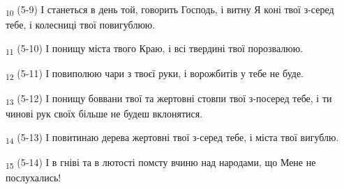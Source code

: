 \begin{tcolorbox}
\textsubscript{10} (5-9) І станеться в день той, говорить Господь, і витну Я коні твої з-серед тебе, і колесниці твої повигублюю.
\end{tcolorbox}
\begin{tcolorbox}
\textsubscript{11} (5-10) І понищу міста твого Краю, і всі твердині твої порозвалюю.
\end{tcolorbox}
\begin{tcolorbox}
\textsubscript{12} (5-11) І повиполюю чари з твоєї руки, і ворожбитів у тебе не буде.
\end{tcolorbox}
\begin{tcolorbox}
\textsubscript{13} (5-12) І понищу боввани твої та жертовні стовпи твої з-посеред тебе, і ти чинові рук своїх більше не будеш вклонятися.
\end{tcolorbox}
\begin{tcolorbox}
\textsubscript{14} (5-13) І повитинаю дерева жертовні твої з-серед тебе, і міста твої вигублю.
\end{tcolorbox}
\begin{tcolorbox}
\textsubscript{15} (5-14) І в гніві та в лютості помсту вчиню над народами, що Мене не послухались!
\end{tcolorbox}
